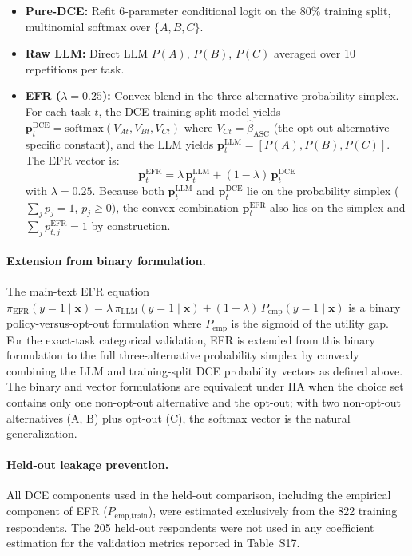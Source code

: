\documentclass[11pt]{article}
\begin{document}
\begin{itemize}
\item \textbf{Pure-DCE:} Refit 6-parameter conditional logit on the 80\% training split, multinomial softmax over $\{A, B, C\}$.
\item \textbf{Raw LLM:} Direct LLM $P(A)$, $P(B)$, $P(C)$ averaged over 10 repetitions per task.
\item \textbf{EFR ($\lambda = 0.25$):} Convex blend in the three-alternative probability simplex. For each task $t$, the DCE training-split model yields $\mathbf{p}^{\mathrm{DCE}}_t = \mathrm{softmax}(V_{At}, V_{Bt}, V_{Ct})$ where $V_{Ct} = \hat\beta_{\mathrm{ASC}}$ (the opt-out alternative-specific constant), and the LLM yields $\mathbf{p}^{\mathrm{LLM}}_t = [P(A), P(B), P(C)]$. The EFR vector is:
\[
\boxed{\;\mathbf{p}^{\mathrm{EFR}}_t = \lambda\,\mathbf{p}^{\mathrm{LLM}}_t + (1-\lambda)\,\mathbf{p}^{\mathrm{DCE}}_t\;}
\]
with $\lambda = 0.25$. Because both $\mathbf{p}^{\mathrm{LLM}}_t$ and $\mathbf{p}^{\mathrm{DCE}}_t$ lie on the probability simplex ($\sum_j p_j = 1$, $p_j \geq 0$), the convex combination $\mathbf{p}^{\mathrm{EFR}}_t$ also lies on the simplex and $\sum_j p^{\mathrm{EFR}}_{t,j} = 1$ by construction.
\end{itemize}

\paragraph{Extension from binary formulation.}\label{par:binary-to-multinomial}
The main-text EFR equation $\pi_{\mathrm{EFR}}(y=1\mid\mathbf{x}) = \lambda\,\pi_{\mathrm{LLM}}(y=1\mid\mathbf{x}) + (1-\lambda)\,P_{\mathrm{emp}}(y=1\mid\mathbf{x})$ is a binary policy-versus-opt-out formulation where $P_{\mathrm{emp}}$ is the sigmoid of the utility gap. For the exact-task categorical validation, EFR is extended from this binary formulation to the full three-alternative probability simplex by convexly combining the LLM and training-split DCE probability vectors as defined above. The binary and vector formulations are equivalent under IIA when the choice set contains only one non-opt-out alternative and the opt-out; with two non-opt-out alternatives (A, B) plus opt-out (C), the softmax vector is the natural generalization.

\paragraph{Held-out leakage prevention.} All DCE components used in the held-out comparison, including the empirical component of EFR ($P_{\text{emp,train}}$), were estimated exclusively from the 822 training respondents. The 205 held-out respondents were not used in any coefficient estimation for the validation metrics reported in Table~S17.
\end{document}
